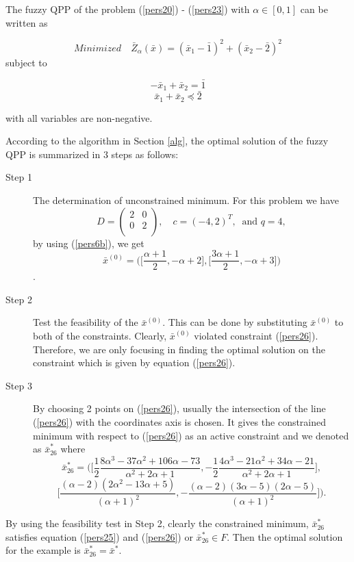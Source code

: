 \documentclass{iaesarticle3}
\begin{document}
The fuzzy QPP of the problem (\ref{pers20}) - (\ref{pers23}) with $\alpha \in [0,1]$ can be written as

\begin{equation}\label{pers24}
    Minimized \quad \bar{Z}_\alpha (\bar{x}) = (\bar{x}_1 - \bar{1})^2 + (\bar{x}_2 - \bar{2})^2
\end{equation}
\noindent
subject to

\begin{equation}\label{pers25}
    -\bar{x}_1 + \bar{x}_2 = \bar{1}
\end{equation}
\begin{equation}\label{pers26}
    \bar{x}_1 + \bar{x}_2 \preceq \bar{2}
\end{equation}

\noindent with all variables are non-negative.

According to the algorithm in Section \ref{alg}, the optimal solution of the fuzzy QPP is summarized in 3 steps as follows:
\begin{description}
  \item[Step 1] The determination of unconstrained minimum. For this problem we have
      \begin{equation}
        D = \left(
          \begin{array}{cc}
            2 & 0 \\
            0 & 2 \\
          \end{array}
        \right), \quad c = (-4, 2)^T,~ \mbox{ and } q = 4,
      \end{equation}
       by using (\ref{pers6b}), we get $$\bar{x}^{(0)} = \bigg( \Big[\frac{\alpha +1}{2}, -\alpha + 2\Big], \Big[\frac{3\alpha +1}{2}, -\alpha +3\Big]\bigg)$$.
  \item[Step 2] Test the feasibility of the $\bar{x}^{(0)}$. This can be done by substituting $\bar{x}^{(0)}$  to both of the constraints. Clearly, $\bar{x}^{(0)}$ violated constraint (\ref{pers26}). Therefore, we  are only focusing in finding the optimal solution on the constraint which is given by  equation (\ref{pers26}).
  \item[Step 3] By choosing 2 points on (\ref{pers26}), usually the intersection of the line (\ref{pers26}) with the coordinates axis is chosen. It gives the constrained minimum with respect to (\ref{pers26}) as an active constraint and we denoted as $\bar{x}^*_{26}$ where
      $$ \bar{x}_{26}^* = \bigg( \Big[\frac{1}{2}\frac{8\alpha^3 - 37\alpha^2 + 106\alpha - 73}{\alpha^2 + 2\alpha + 1}, -\frac{1}{2}\frac{4\alpha^3 - 21\alpha^2 +34\alpha - 21}{\alpha^2 + 2\alpha + 1}\Big],$$
       $$\Big[ \frac{(\alpha - 2)(2\alpha^2 - 13\alpha + 5)}{(\alpha + 1)^2}, -\frac{(\alpha - 2)(3\alpha - 5)(2\alpha - 5)}{(\alpha + 1)^2}\Big] \bigg).$$
\end{description}
By using the feasibility test in Step 2, clearly the constrained minimum, $\bar{x}_{26}^*$ satisfies equation (\ref{pers25}) and (\ref{pers26}) or $\bar{x}_{26}^* \in F$. Then the optimal solution for the example is $\bar{x}_{26}^* = \bar{x}^*$.\\
\end{document}
